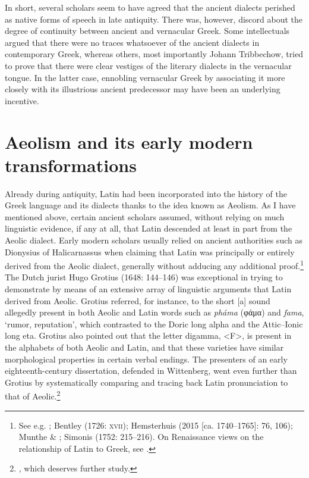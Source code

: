 In short, several scholars seem to have agreed that the ancient dialects perished as native forms of speech in late antiquity. There was, however, discord about the degree of continuity between ancient and vernacular Greek. Some intellectuals argued that there were no traces whatsoever of the ancient dialects in contemporary Greek, whereas others, most importantly Johann Tribbechow, tried to prove that there were clear vestiges of the literary dialects in the vernacular tongue. In the latter case, ennobling vernacular Greek by associating it more closely with its illustrious ancient predecessor may have been an underlying incentive.

\section{Aeolism and its early modern transformations}

Already during antiquity, Latin had been incorporated into the history of the Greek language and its dialects thanks to the idea known as Aeolism. As I have mentioned above, certain ancient scholars assumed, without relying on much linguistic evidence, if any at all, that Latin descended at least in part from the Aeolic dialect. Early modern scholars usually relied on ancient authorities such as Dionysius of Halicarnassus when claiming that Latin was principally or entirely derived from the Aeolic dialect, generally without adducing any additional proof.\footnote{See e.g. \citet[84]{Crinesius1629}; Bentley (1726: \textsc{xvii}); Hemsterhuis (2015 [ca. 1740–1765]: 76, 106); Munthe \& \citet[30]{Heiberg1748}; Simonis (1752: 215–216). On Renaissance views on the relationship of Latin to Greek, see \citet{Tavoni1986}.} The Dutch jurist Hugo Grotius (1648: 144–146) was exceptional in trying to demonstrate by means of an extensive array of linguistic arguments that Latin derived from Aeolic. Grotius referred, for instance, to the short [a] sound allegedly present in both Aeolic and Latin words such as \textit{pháma} (φάμα) and \textit{fama}, ‘rumor, reputation’, which contrasted to the Doric long alpha and the Attic–Ionic long eta. Grotius also pointed out that the letter digamma, <F>, is present in the alphabets of both Aeolic and Latin, and that these varieties have similar morphological properties in certain verbal endings. The presenters of an early eighteenth-century dissertation, defended in Wittenberg, went even further than Grotius by systematically comparing and tracing back Latin pronunciation to that of Aeolic.\footnote{\citet{ThryllitschBrunner1709}, which deserves further study.}

